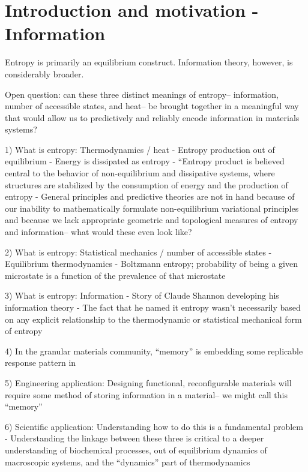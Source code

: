 \documentclass[11pt, oneside]{article}   	%
\begin{document}
\section{Introduction and motivation - Information}

Entropy is primarily an equilibrium construct. Information theory, however, is considerably broader. 

Open question: can these three distinct meanings of entropy-- information, number of accessible states, and heat-- be brought together in a meaningful way that would allow us to predictively and reliably encode information in materials systems?

1) What is entropy: Thermodynamics / heat - Entropy production out of equilibrium
- Energy is dissipated as entropy
- ``Entropy product is believed central to the behavior of non-equilibrium and dissipative systems, where structures are stabilized by the consumption of energy and the production of entropy
- General principles and predictive theories are not in hand because of our inability to mathematically formulate non-equilibrium variational principles and because we lack appropriate geometric and topological measures of entropy and information-- what would these even look like?

2) What is entropy: Statistical mechanics / number of accessible states - Equilibrium thermodynamics
- Boltzmann entropy; probability of being a given microstate is a function of the prevalence of that microstate

3) What is entropy: Information
- Story of Claude Shannon developing his information theory
- The fact that he named it entropy wasn't necessarily based on any explicit relationship to the thermodynamic or statistical mechanical form of entropy

4) In the granular materials community, ``memory'' is embedding some replicable response pattern in 

5) Engineering application: Designing functional, reconfigurable materials will require some method of storing information in a material-- we might call this ``memory''

6) Scientific application: Understanding how to do this is a fundamental problem
- Understanding the linkage between these three is critical to a deeper understanding of biochemical processes, out of equilibrium dynamics of macroscopic systems, and the ``dynamics'' part of thermodynamics
\end{document}
